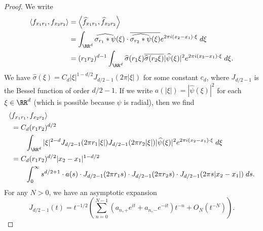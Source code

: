 \begin{proof}
%
    We write
    \begin{align*}
        \langle f_{x_1 r_1}, f_{x_2 r_2} \rangle &= \left\langle \widehat{f}_{x_1 r_1}, \widehat{f}_{x_2 r_2} \right\rangle\\
        &= \int_{\RR^d} \widehat{\sigma_{r_1} * \psi}(\xi) \cdot \overline{\widehat{\sigma_{r_2} * \psi}(\xi)} e^{2 \pi i (x_2 - x_1) \cdot \xi}\; d\xi\\
        &= (r_1 r_2)^{d-1} \int_{\RR^d} \widehat{\sigma}(r_1 \xi) \overline{\widehat{\sigma}(r_2 \xi)} |\widehat{\psi}(\xi)|^2 e^{2 \pi i (x_2 - x_1) \cdot \xi}\; d\xi.
    \end{align*}
    We have $\widehat{\sigma}(\xi) = C_d |\xi|^{1-d/2} J_{d/2 - 1}(2 \pi |\xi|)$ for some constant $c_d$, where $J_{d/2 - 1}$ is the Bessel function of order $d/2 - 1$. If we write $a(|\xi|) = |\widehat{\psi}(\xi)|^2$ for each $\xi \in \RR^d$ (which is possible because $\psi$ is radial), then we find
    \begin{align*}
        \langle &f_{x_1 r_1}, f_{x_2 r_2} \rangle\\
        &= C_d (r_1 r_2)^{d/2}\\
        &\quad\quad \int_{\RR^d} |\xi|^{2 - d} J_{d/2 - 1}(2 \pi r_1 |\xi|) J_{d/2 - 1}(2 \pi r_2 |\xi|) |\widehat{\psi}(\xi)|^2 e^{2 \pi i (x_2 - x_1) \cdot \xi}\; d\xi\\
        &= C_d (r_1 r_2)^{d/2} |x_2 - x_1|^{1 - d/2}\\
        &\quad\quad \int_0^\infty s^{d/2 + 1} \cdot a(s) \cdot J_{d/2 - 1}(2 \pi r_1 s) \cdot J_{d/2 - 1}(2 \pi r_2 s) \cdot J_{d/2 - 1}(2 \pi s |x_2 - x_1|)\; ds.
    \end{align*}
    For any $N > 0$, we have an asymptotic expansion
    \[ J_{d/2 - 1}(t) = t^{-1/2} \left( \sum_{n = 0}^{N-1} (a_{n,+} e^{it} + a_{n,-} e^{-it}) t^{-n} + O_N(t^{-N}) \right). \]

\end{proof}
